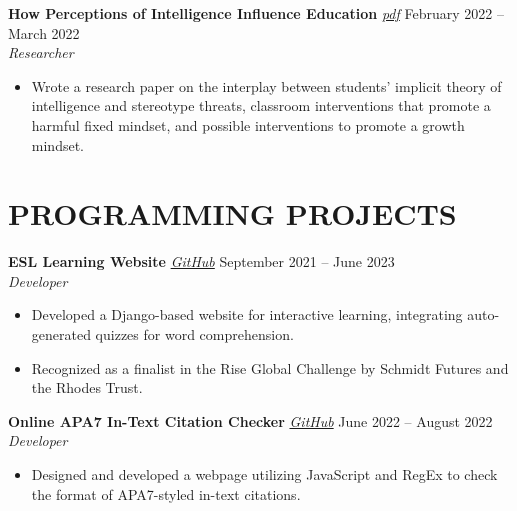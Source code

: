 \documentclass[letterpaper, 9pt]{extarticle}
\begin{document}
\noindent
\textbf{How Perceptions of Intelligence Influence Education} 
\emph{\href{https://drive.google.com/file/d/1lgQKk7_geC_NsAG5uHnPfWY3wKy38_-o/view?usp=sharing}{\color{blue} pdf}} 
\hfill February 2022 -- March 2022 \\
\textit{Researcher} 
\begin{itemize}
    \item Wrote a research paper on the interplay between students' implicit theory of intelligence and stereotype threats, classroom interventions that promote a harmful fixed mindset, and possible interventions to promote a growth mindset. 
\end{itemize}


\section*{PROGRAMMING PROJECTS}

\noindent
\textbf{ESL Learning Website} 
\emph{\href{https://github.com/AdenChen27/Project_0}{\color{blue} GitHub}}
\hfill September 2021 -- June 2023  \\
\textit{Developer}
\begin{itemize}
    \item Developed a Django-based website for interactive learning, integrating auto-generated quizzes for word comprehension. 
    \item Recognized as a finalist in the Rise Global Challenge by Schmidt Futures and the Rhodes Trust.
\end{itemize}

\noindent
\textbf{Online APA7 In-Text Citation Checker} 
\emph{\href{https://github.com/AdenChen27/AdenChen27.github.io/tree/main/citation_checker}{\color{blue} GitHub}}
\hfill June 2022 -- August 2022 \\
\textit{Developer} 
\begin{itemize}
    \item Designed and developed a webpage utilizing JavaScript and RegEx to check the format of APA7-styled in-text citations.
\end{itemize}
\end{document}
